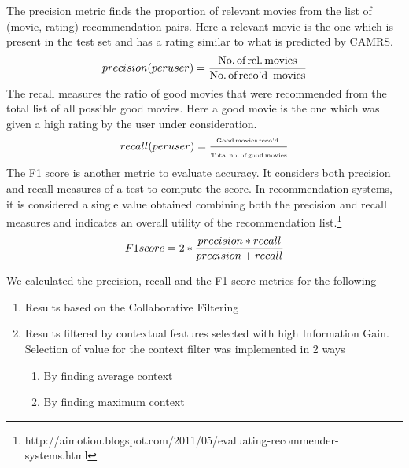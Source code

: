 \documentclass{article}
\begin{document}
The precision metric finds the proportion of relevant movies from the list of (movie, rating) recommendation pairs. Here a relevant movie   is the one which is present in the test set and has a rating similar to what is predicted by CAMRS.
\begin{equation}
precision (per user) = \frac{\text{No.\,of\,rel.\,movies}} {\text{No.\,of\,reco'd\, movies}}
\end{equation} 
The recall measures the ratio of good movies that were recommended from the total list of all possible good movies. Here a good movie is the one which was given a high rating by the user under consideration.
\begin{equation}
\begin{tiny}
recall (per user) = \frac{\text{Good\,movies\,reco'd }}{\text{Total\,no.\,of\,good\,movies}}
\end{tiny}
\end{equation}
 The F1 score is another metric to evaluate accuracy.  It considers both precision and recall measures of a test to compute the score. In recommendation systems, it is considered a single value obtained combining both the precision and recall measures and indicates an overall utility of the recommendation list.\footnote{http://aimotion.blogspot.com/2011/05/evaluating-recommender-systems.html}
\begin{equation}
\begin{tiny}
F1 score = 2 * \frac{precision * recall}{precision + recall}
\end{tiny}
\end{equation}

 We calculated the precision, recall and the F1 score metrics for the following 
\begin{enumerate} 
\item Results based on the Collaborative Filtering
\item Results filtered by contextual features selected with high Information Gain. Selection of value for the context filter was implemented in 2 ways
\begin{enumerate}
\item By finding average context 
\item By finding maximum context
\end{enumerate}
\end{enumerate}
\end{document}
